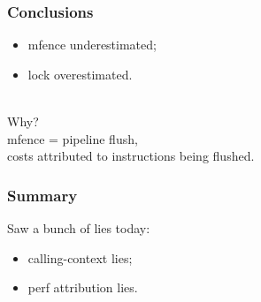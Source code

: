 \documentclass[aspectratio=43]{beamer}
\newenvironment{changemargin}[1]{%
  \begin{list}{}{%
    \setlength{\topsep}{0pt}%
    \setlength{\leftmargin}{#1}%
    \setlength{\rightmargin}{1em}
    \setlength{\listparindent}{\parindent}%
    \setlength{\itemindent}{\parindent}%
    \setlength{\parsep}{\parskip}%
  }%
  \item[]}{\end{list}}
\begin{document}
\begin{frame}
  \frametitle{Conclusions}

  \begin{changemargin}{2cm}
    \begin{itemize}
    \item mfence underestimated;
      \item lock overestimated.
    \end{itemize}
    ~\\
    Why? \\[1em]
    mfence = pipeline flush,\\
    costs attributed to instructions being flushed.\\
  \end{changemargin}

\end{frame}

\begin{frame}
  \frametitle{Summary}
  \begin{changemargin}{2cm}
    Saw a bunch of lies today:\\
    \begin{itemize}
    \item calling-context lies;
    \item perf attribution lies.
    \end{itemize}
  \end{changemargin}
\end{frame}
\end{document}
